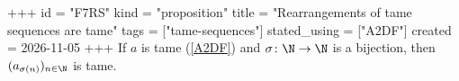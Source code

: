 +++
id = "F7RS"
kind = "proposition"
title = "Rearrangements of tame sequences are tame"
tags = ["tame-sequences"]
stated_using = ["A2DF"]
created = 2026-11-05
+++
If $a$ is tame (\ref{A2DF}) and $\sigma \colon \N \to \N$ is a bijection, then $(a_{\sigma(n)})_{n \in \N}$ is tame.
